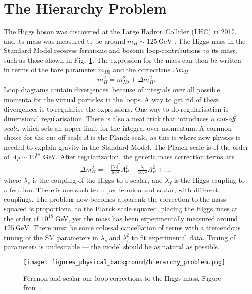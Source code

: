 \documentclass[twoside,english]{uiofysmaster}
\begin{document}
\section{The Hierarchy Problem}

The Higgs boson was discovered at the Large Hadron Collider (LHC) in 2012, and its mass was measured to be around $m_H \sim 125~\mathrm{GeV}$ \cite{Aad:2012tfa}. The Higgs mass in the Standard Model receives fermionic and bosonic loop-contributions to its mass, such as those shown in Fig.~\ref{Fig:: Phys. bac.: Higgs mass contributions}. The expression for the mass can then be written in terms of the bare parameter $m_{H0}$ and the corrections $\Delta m_H$
\begin{align*}
m_H^2 = m_{H0}^2 + \Delta m_H^2.
\end{align*}
Loop diagrams contain divergences, because of integrals over all possible momenta for the virtual particles in the loops. A way to get rid of these divergences is to regularise the expressions. One way to do regularisation is dimensional regularisation. There is also a neat trick that introduces a \textit{cut-off scale}, which sets an upper limit for the integral over momentum. A common choice for the cut-off scale $\Lambda$ is the Planck scale, as this is where new physics is needed to explain gravity in the Standard Model. The Planck scale is of the order of $\Lambda_P \sim 10^{18}$ GeV. After regularization, the generic mass correction terms are
\begin{align}
\Delta m_H^2 = - \frac{|\lambda_f|^2}{8\pi^2} \Lambda_P^2 + \frac{\lambda_s}{16\pi^2} \Lambda_P^2 +...,
\end{align}
where $\lambda_s$ is the coupling of the Higgs to a scalar, and $\lambda_f$ is the Higgs coupling to a fermion. There is one such term per fermion and scalar, with different couplings. The problem now becomes apparent: the correction to the mass squared is proportional to the Planck scale squared, placing the Higgs mass at the order of $10^{18}$ GeV, yet the mass has been experimentally measured around $125~\mathrm{GeV}$. There must be some colossal cancellation of terms with a tremendous tuning of the SM parameters in $\lambda_s$ and $\lambda_f^2$ to fit experimental data. Tuning of parameters is undesirable --- the model should be as natural as possible. 

\begin{figure}[H]
\centering
\texttt{[image: figures\_physical\_background/hierarchy\_problem.png]}
\caption[One-loop corrections to the Higgs boson mass.]{Fermion and scalar one-loop corrections to the Higgs mass. Figure from \cite{batzing2017lecture}.}
\label{Fig:: Phys. bac.: Higgs mass contributions}
\end{figure}
\end{document}
